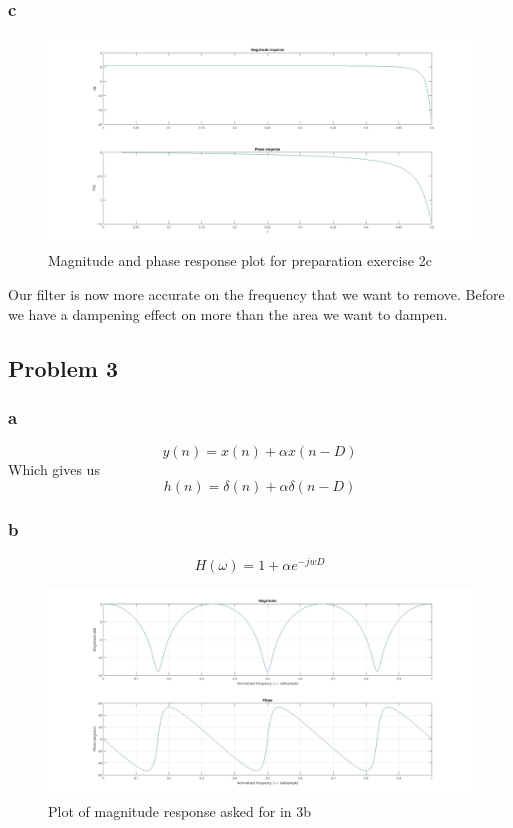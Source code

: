 \documentclass[a4paper,11pt]{article}
\begin{document}
\subsubsection{c}
\begin{figure}[H]
    \hspace{-40pt}\includegraphics[scale=0.28]{./images/prep-2c.jpg}
    \caption{Magnitude and phase response plot for preparation exercise 2c}
\end{figure}
Our filter is now more accurate on the frequency that we want to remove. Before we have a dampening effect on more than the area we want to dampen. 

\subsection{Problem 3}
\subsubsection{a}
\[
y(n) = x(n) + \alpha x(n-D)
\]
Which gives us
\[
h(n) = \delta(n) + \alpha\delta(n-D)
\]
\subsubsection{b}
\[
H(\omega) = 1 + \alpha e^{-jwD}
\]
\begin{figure}[H]
    \hspace{-40pt}\includegraphics[scale=0.28]{./images/prep-3b.jpg}
    \caption{Plot of magnitude response asked for in 3b}
    \label{fig:my_label}
\end{figure}
\end{document}
